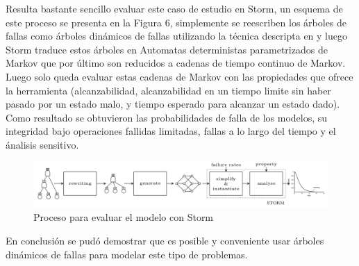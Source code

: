 \documentclass[11pt]{article}
\begin{document}
Resulta bastante sencillo evaluar este caso de estudio en Storm, un esquema de este proceso se presenta en la Figura 6, simplemente se reescriben los \'arboles de fallas como \'arboles din\'amicos de fallas utilizando la t\'ecnica descripta en \cite{Tree} y luego Storm traduce estos \'arboles en Automatas deterministas parametrizados de Markov que por \'ultimo son reducidos a cadenas de tiempo continuo de Markov. Luego solo queda evaluar estas cadenas de Markov con las propiedades que ofrece la herramienta (alcanzabilidad, alcanzabilidad en un tiempo limite sin haber pasado por un estado malo, y tiempo esperado para alcanzar un estado dado). Como resultado se obtuvieron las probabilidades de falla de los modelos, su integridad bajo operaciones fallidas limitadas, fallas a lo largo del tiempo y el \'analisis sensitivo. %


\begin{figure}[h]
	\includegraphics[scale=0.3]{stormapproach.png} 
	\centering
	\caption{Proceso para evaluar el modelo con Storm}%
\end{figure}

En conclusi\'on se pud\'o demostrar que es posible y conveniente usar \'arboles din\'amicos de fallas para modelar este tipo de problemas.


\end{document}
